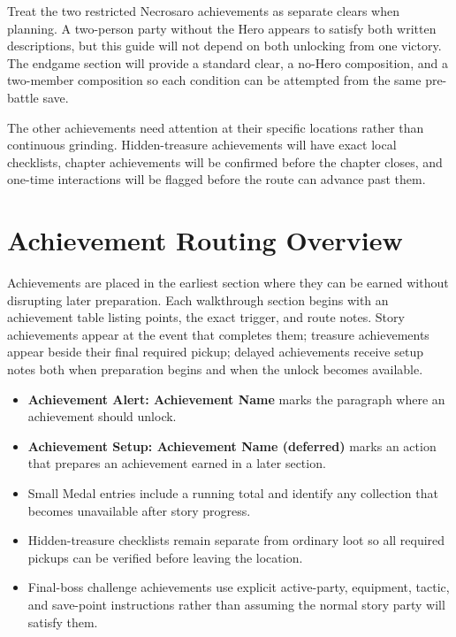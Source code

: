 \documentclass[
  american,
  10pt,
  letterpaper,
  oneside,
  open=any]{scrreprt}
\providecommand{\tightlist}{%
  \setlength{\itemsep}{0pt}\setlength{\parskip}{0pt}}
\begin{document}
Treat the two restricted Necrosaro achievements as separate clears when
planning. A two-person party without the Hero appears to satisfy both
written descriptions, but this guide will not depend on both unlocking
from one victory. The endgame section will provide a standard clear, a
no-Hero composition, and a two-member composition so each condition can
be attempted from the same pre-battle save.

The other achievements need attention at their specific locations rather
than continuous grinding. Hidden-treasure achievements will have exact
local checklists, chapter achievements will be confirmed before the
chapter closes, and one-time interactions will be flagged before the
route can advance past them.

\section{Achievement Routing
Overview}\label{achievement-routing-overview}

Achievements are placed in the earliest section where they can be earned
without disrupting later preparation. Each walkthrough section begins
with an achievement table listing points, the exact trigger, and route
notes. Story achievements appear at the event that completes them;
treasure achievements appear beside their final required pickup; delayed
achievements receive setup notes both when preparation begins and when
the unlock becomes available.

\begin{itemize}
\tightlist
\item
  \textbf{Achievement Alert: Achievement Name} marks the paragraph where
  an achievement should unlock.
\item
  \textbf{Achievement Setup: Achievement Name (deferred)} marks an
  action that prepares an achievement earned in a later section.
\item
  Small Medal entries include a running total and identify any
  collection that becomes unavailable after story progress.
\item
  Hidden-treasure checklists remain separate from ordinary loot so all
  required pickups can be verified before leaving the location.
\item
  Final-boss challenge achievements use explicit active-party,
  equipment, tactic, and save-point instructions rather than assuming
  the normal story party will satisfy them.
\end{itemize}
\end{document}
